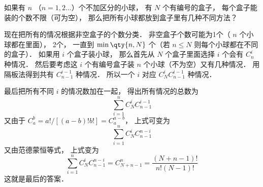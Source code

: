 

如果有 $n$ （$n=1,2\dots$）个不加区分的小球， 有 $N$ 个有编号的盒子， 每个盒子能装的个数不限（可为空）， 那么把所有小球都放到盒子里有几种不同方法？

现在把所有的情况根据非空盒子的个数分类． 非空盒子个数可能为1个（ $n$ 个小球都在里面）， 2个， 一直到 $\min\qty{n,N}$ 个（若 $n\leqslant N$ 则每个小球都在不同的盒子）． 如果用 $i$ 个盒子装小球， 那么首先从 $N$ 个盒子里面选择 $i$ 个会有 $C_n^i$ 种情况． 然后要考虑这 $i$ 个有编号盒子装 $n$ 个小球（不为空）又有几种情况． 用隔板法得到共有 $C_{n-1}^{i-1}$ 种情况． 所以一个 $i$ 对应 $C_N^i C_{n-1}^{i-1}$ 种情况．

最后把所有不同 $i$ 的情况数加在一起， 得出所有情况的总数为
\begin{equation}
\sum_{i = 1}^n C_N^i C_{n-1}^{i-1}
\end{equation}
又由于 $C_a^b = a!/[(a-b)!b!] = C_a^{a-b}$， 上式可变为
\begin{equation}
\sum_{i=1}^n  C_N^i C_{n-1}^{n-i}
\end{equation}
又由范德蒙恒等式， 上式变为
\begin{equation}
\sum_{i=1}^n C_N^i C_{n-1}^{n-i} = C_{N+n-1}^n = \frac{(N+n-1)!}{n!(N - 1)!}
\end{equation}
这就是最后的答案．

